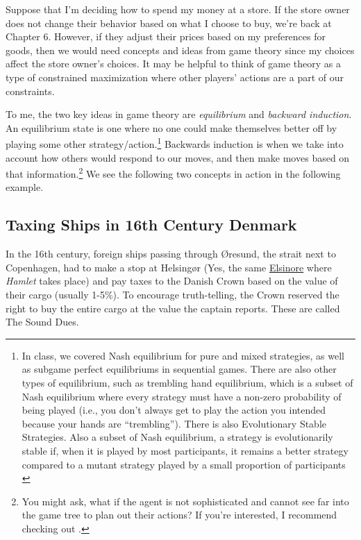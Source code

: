 Suppose that I'm deciding how to spend my money at a store. If the store owner does not change their behavior based on what I choose to buy, we're back at Chapter 6. However, if they adjust their prices based on my preferences for goods, then we would need concepts and ideas from game theory since my choices affect the store owner's choices. It may be helpful to think of game theory as a type of constrained maximization where other players' actions are a part of our constraints.

To me, the two key ideas in game theory are \textit{equilibrium} and \textit{backward induction}. An equilibrium state is one where no one could make themselves better off by playing some other strategy/action.\footnote{In class, we covered Nash equilibrium for pure and mixed strategies, as well as subgame perfect equilibriums in sequential games. There are also other types of equilibrium, such as trembling hand equilibrium, which is a subset of Nash equilibrium where every strategy must have a non-zero probability of being played (i.e., you don't always get to play the action you intended because your hands are ``trembling''). There is also Evolutionary Stable Strategies. Also a subset of Nash equilibrium, a strategy is evolutionarily stable if, when it is played by most participants, it remains a better strategy compared to a mutant strategy played by a small proportion of participants \citep{Broom_2013_Gamerbio}} Backwards induction is when we take into account how others would respond to our moves, and then make moves based on that information.\footnote{You might ask, what if the agent is not sophisticated and cannot see far into the game tree to plan out their actions? If you're interested, I recommend checking out \citet{li_2017_OSP}.} We see the following two concepts in action in the following example.

\subsection*{Taxing Ships in 16th Century Denmark \citep{Haan_2012_Taxation}}

In the 16th century, foreign ships passing through Øresund, the strait next to Copenhagen, had to make a stop at Helsingør (Yes, the same \href{https://en.wikipedia.org/wiki/Hamlet}{Elsinore} where \textit{Hamlet} takes place) and pay taxes to the Danish Crown based on the value of their cargo (usually 1-5\%). To encourage truth-telling, the Crown reserved the right to buy the entire cargo at the value the captain reports. These are called The Sound Dues. 

